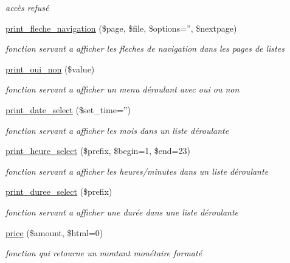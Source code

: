 \begin{CompactItemize}
\begin{CompactList}\small\item\em acc\`{e}s refus\'{e} \item\end{CompactList}\item 
\hyperlink{functions_8inc_8php_a33}{print\_\-fleche\_\-navigation} (\$page, \$file, \$options='', \$nextpage)
\begin{CompactList}\small\item\em fonction servant a afficher les fleches de navigation dans les pages de listes \item\end{CompactList}\item 
\hyperlink{functions_8inc_8php_a34}{print\_\-oui\_\-non} (\$value)
\begin{CompactList}\small\item\em fonction servant a afficher un menu d\'{e}roulant avec oui ou non \item\end{CompactList}\item 
\hyperlink{functions_8inc_8php_a35}{print\_\-date\_\-select} (\$set\_\-time='')
\begin{CompactList}\small\item\em fonction servant a afficher les mois dans un liste d\'{e}roulante \item\end{CompactList}\item 
\hyperlink{functions_8inc_8php_a36}{print\_\-heure\_\-select} (\$prefix, \$begin=1, \$end=23)
\begin{CompactList}\small\item\em fonction servant a afficher les heures/minutes dans un liste d\'{e}roulante \item\end{CompactList}\item 
\hyperlink{functions_8inc_8php_a37}{print\_\-duree\_\-select} (\$prefix)
\begin{CompactList}\small\item\em fonction servant a afficher une dur\'{e}e dans une liste d\'{e}roulante \item\end{CompactList}\item 
\hyperlink{functions_8inc_8php_a38}{price} (\$amount, \$html=0)
\begin{CompactList}\small\item\em fonction qui retourne un montant mon\'{e}taire format\'{e} \item\end{CompactList}\item 

\end{CompactItemize}
